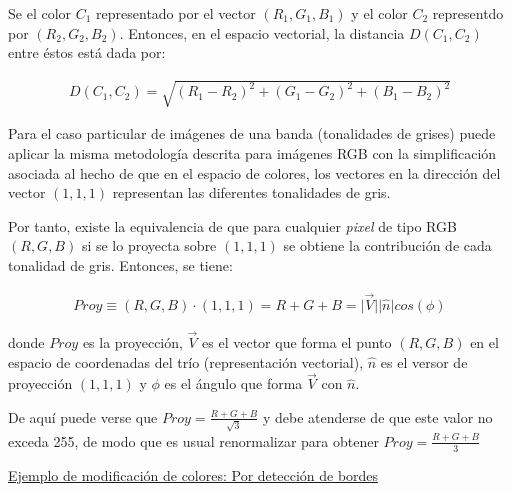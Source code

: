 %
Se el color $C_{1}$ representado por el vector $(R_{1}, G_{1}, B_{1})$ y el color $C_{2}$ representdo por $(R_{2}, G_{2}, B_{2})$.
%
Entonces, en el espacio vectorial, la distancia $D (C_{1}, C_{2})$ entre \'estos est\'a dada por:

%

\begin{eqnarray}
	D(C_{1}, C_{2}) = \sqrt{ \left(R_{1} - R_{2} \right)^{2} + \left(G_{1} - G_{2} \right)^{2} + \left(B_{1} - B_{2} \right)^{2}}
\label{EqXXII}
\end{eqnarray}

Para el caso particular de im\'agenes de una banda (tonalidades de grises) puede aplicar la misma metodolog\'ia descrita para im\'agenes RGB con la 
simplificaci\'on asociada al hecho de que en el espacio de colores, los vectores en la direcci\'on del vector $(1, 1, 1)$ representan
las diferentes tonalidades de gris. 
%

%
Por tanto, existe la equivalencia de que para cualquier \textit{pixel} de tipo RGB $(R, G, B)$ si se lo proyecta sobre $(1, 1, 1)$ se obtiene la 
contribuci\'on de cada tonalidad de gris.
%
Entonces, se tiene:

\begin{eqnarray}
	Proy \equiv (R, G, B) \cdot (1, 1, 1) =R + G + B = \lvert \vec{V} \rvert \lvert \hat{n} \rvert cos(\phi)
\label{EqXXIIb}
\end{eqnarray}

donde $Proy$ es la proyecci\;\'on, $\vec{V}$ es el vector que forma el punto $(R, G, B)$ en el espacio de coordenadas del tr\'io (representaci\'on vectorial),
$\hat{n}$ es el versor de proyecci\'on $(1, 1, 1)$ y $\phi$ es el \'angulo que forma $\vec{V}$ con $\hat{n}$.
%

%
De aqu\'i puede verse que $Proy = \frac{R + G + B}{\sqrt{3}}$ y debe atenderse de que este valor no exceda 255, de modo que es usual renormalizar para 
obtener $Proy = \frac{R + G + B}{3}$

\vspace{1.0cm}


\begin{center}

\underline{Ejemplo de modificaci\'on de colores: Por detecci\'on de bordes}

\end{center}

